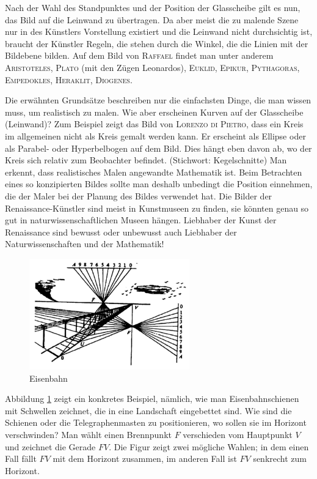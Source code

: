 \documentclass[%
11pt,%
twoside,%
titlepage,%
a4page,%
german,%
headsepline%
]{scrartcl}
\begin{document}
Nach der Wahl des Standpunktes und der Position der Glasscheibe gilt es nun, das Bild auf die Leinwand zu \"ubertragen. Da aber meist die zu malende Szene nur in des K\"unstlers Vorstellung existiert und die Leinwand nicht durchsichtig ist, braucht der K\"unstler Regeln, die stehen durch die Winkel, die die Linien mit der Bildebene bilden. Auf dem Bild von \textsc{Raffael} findet man unter anderem \textsc{Aristoteles, Plato} (mit den Z\"ugen Leonardos), \textsc{Euklid, Epikur, Pythagoras, Empedokles, Heraklit, Diogenes}.

Die erw\"ahnten Grunds\"atze beschreiben nur die einfachsten Dinge, die man wissen muss, um realistisch zu malen. Wie aber erscheinen Kurven auf der Glasscheibe (Leinwand)?
Zum Beispiel zeigt das Bild von \textsc{Lorenzo di Pietro}, dass ein Kreis im allgemeinen nicht als Kreis gemalt werden kann. Er erscheint als Ellipse oder als Parabel- oder Hyperbelbogen auf dem Bild. Dies h\"angt eben davon ab, wo der Kreis sich relativ zum Beobachter befindet. (Stichwort: Kegelschnitte)
Man erkennt, dass realistisches Malen angewandte Mathematik ist. Beim Betrachten eines so konzipierten Bildes sollte man deshalb unbedingt die Position einnehmen, die der Maler bei der Planung des Bildes verwendet hat. Die Bilder der Renaissance-K\"unstler sind meist in Kunstmuseen zu finden, sie k\"onnten genau so gut in naturwissenschaftlichen Museen h\"angen. Liebhaber der Kunst der Renaissance sind bewusst oder unbewusst auch Liebhaber der Naturwissenschaften und der Mathematik!

\begin{figure}[h!]
\begin{center}
\includegraphics[width=0.618\textwidth]{pictures/eisenbahn}
\end{center}
\caption{Eisenbahn}\label{eisenbahn}
\end{figure}

Abbildung \ref{eisenbahn} zeigt ein konkretes Beispiel, n\"amlich, wie man Eisenbahnschienen mit Schwellen zeichnet, die in eine Landschaft eingebettet sind. Wie sind die Schienen oder die Telegraphenmasten zu positionieren, wo sollen sie im Horizont verschwinden? Man w\"ahlt einen Brennpunkt $F$ verschieden vom Hauptpunkt $V$ und zeichnet die Gerade $FV$. Die Figur zeigt zwei m\"ogliche Wahlen; in dem einen Fall f\"allt $FV$ mit dem Horizont zusammen, im anderen Fall ist $FV$ senkrecht zum Horizont.
\end{document}
